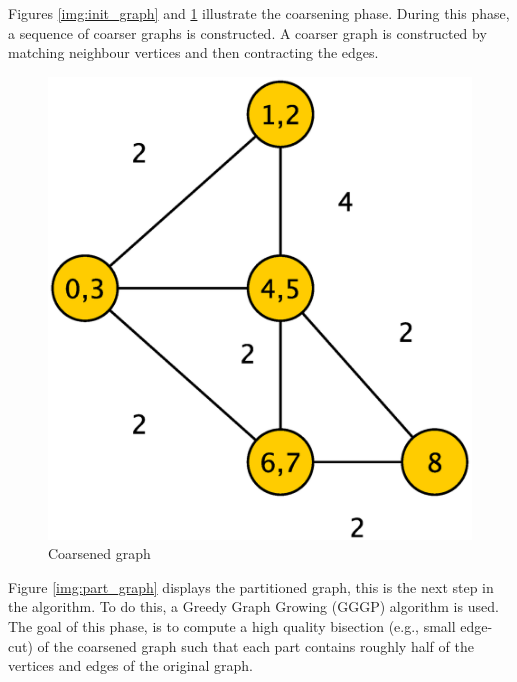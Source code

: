 \documentclass[abstract=on,9pt,twocolumn]{scrartcl}
\begin{document}
Figures \ref{img:init_graph} and \ref{img:coarse_graph} illustrate the coarsening phase. During this phase, a sequence of coarser graphs is constructed.\cite{Karypis95parallelmultilevel} A coarser graph is constructed by matching neighbour vertices and then contracting the edges.

\begin{center}
  \begin{figure}[htb]
    \includegraphics[width=\columnwidth]{img/coarsening2.eps}
    \caption{Coarsened graph}
    \label{img:coarse_graph}
  \end{figure}
\end{center}

Figure \ref{img:part_graph} displays the partitioned graph, this is the next step in the algorithm. To do this, a Greedy Graph Growing (GGGP) algorithm is used.\cite{Karypis:1998:FHQ:305219.305248} The goal of this phase, is to compute a high quality bisection (e.g., small edge-cut) of the coarsened graph such that each part contains roughly half of the vertices and edges of the original graph.
\end{document}
